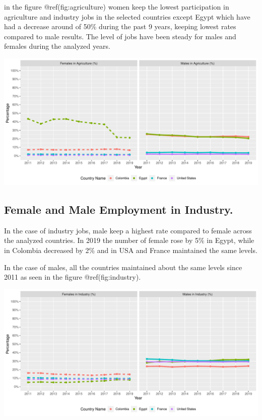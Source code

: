 \documentclass[
]{article}
\begin{document}
in the figure @ref(fig:agriculture) women keep the lowest participation
in agriculture and industry jobs in the selected countries except Egypt
which have had a decrease around of 50\% during the past 9 years,
keeping lowest rates compared to male results. The level of jobs have
been steady for males and females during the analyzed years.

\includegraphics{The_Outsiders_5513_files/figure-latex/agriculture-1.pdf}

\hypertarget{female-and-male-employment-in-industry.}{%
\subsection{Female and Male Employment in
Industry.}\label{female-and-male-employment-in-industry.}}

In the case of industry jobs, male keep a highest rate compared to
female across the analyzed countries. In 2019 the number of female rose
by 5\% in Egypt, while in Colombia decreased by 2\% and in USA and
France maintained the same levels.

In the case of males, all the countries maintained about the same levels
since 2011 as seen in the figure @ref(fig:industry).

\includegraphics{The_Outsiders_5513_files/figure-latex/industry-1.pdf}
\end{document}
